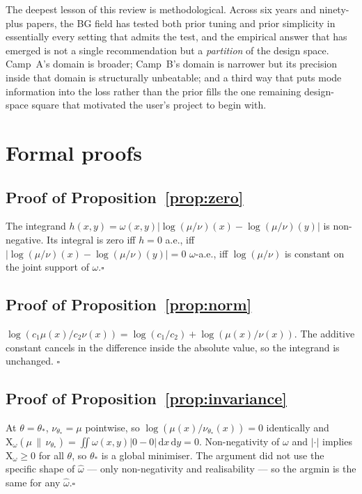 \documentclass[11pt,letterpaper]{article}
\newcommand{\Xfun}{\mathrm{X}}
\newcommand{\Ge}{\geqslant}
\newcommand{\dd}{\mathrm{d}}
\theoremstyle{plain}
\begin{document}
The deepest lesson of this review is methodological. Across six years and
ninety-plus papers, the BG field has tested both prior tuning and prior
simplicity in essentially every setting that admits the test, and the
empirical answer that has emerged is not a single recommendation but a
\emph{partition} of the design space. Camp~A's domain is broader; Camp~B's
domain is narrower but its precision inside that domain is structurally
unbeatable; and a third way that puts mode information into the loss rather
than the prior fills the one remaining design-space square that motivated
the user's project to begin with.

\appendix
\section{Formal proofs}

\subsection{Proof of Proposition~\ref{prop:zero}}

The integrand $h(x,y)=\omega(x,y)|\log(\mu/\nu)(x)-\log(\mu/\nu)(y)|$ is
non-negative. Its integral is zero iff $h=0$ a.e., iff
$|\log(\mu/\nu)(x)-\log(\mu/\nu)(y)|=0$ $\omega$-a.e., iff $\log(\mu/\nu)$ is
constant on the joint support of $\omega$.\hfill$\square$

\subsection{Proof of Proposition~\ref{prop:norm}}

$\log(c_1\mu(x)/c_2\nu(x))=\log(c_1/c_2)+\log(\mu(x)/\nu(x))$. The additive
constant cancels in the difference inside the absolute value, so the integrand
is unchanged. \hfill$\square$

\subsection{Proof of Proposition~\ref{prop:invariance}}

At $\theta=\theta_*$, $\nu_{\theta_*}=\mu$ pointwise, so
$\log(\mu(x)/\nu_{\theta_*}(x))=0$ identically and
$\Xfun_\omega(\mu\,\|\,\nu_{\theta_*})=\iint\omega(x,y)|0-0|\,\dd x\,\dd y=0$.
Non-negativity of $\omega$ and $|\cdot|$ implies $\Xfun_\omega\Ge 0$ for all
$\theta$, so $\theta_*$ is a global minimiser. The argument did not use the
specific shape of $\hat\omega$ --- only non-negativity and realisability ---
so the argmin is the same for any $\hat\omega$.\hfill$\square$
\end{document}
